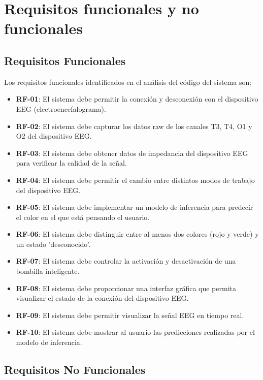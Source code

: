 \newpage

\section{Requisitos funcionales y no funcionales}
\subsection{Requisitos Funcionales}

Los requisitos funcionales identificados en el análisis del código del sistema son:

\begin{itemize}
    \item \textbf{RF-01}: El sistema debe permitir la conexión y desconexión con el dispositivo EEG (electroencefalograma).
    \item \textbf{RF-02}: El sistema debe capturar los datos raw de los canales T3, T4, O1 y O2 del dispositivo EEG.
    \item \textbf{RF-03}: El sistema debe obtener datos de impedancia del dispositivo EEG para verificar la calidad de la señal.
    \item \textbf{RF-04}: El sistema debe permitir el cambio entre distintos modos de trabajo del dispositivo EEG.
    \item \textbf{RF-05}: El sistema debe implementar un modelo de inferencia para predecir el color en el que está pensando el usuario.
    \item \textbf{RF-06}: El sistema debe distinguir entre al menos dos colores (rojo y verde) y un estado 'desconocido'.
    \item \textbf{RF-07}: El sistema debe controlar la activación y desactivación de una bombilla inteligente.
    \item \textbf{RF-08}: El sistema debe proporcionar una interfaz gráfica que permita visualizar el estado de la conexión del dispositivo EEG.
    \item \textbf{RF-09}: El sistema debe permitir visualizar la señal EEG en tiempo real.
    \item \textbf{RF-10}: El sistema debe mostrar al usuario las predicciones realizadas por el modelo de inferencia.
\end{itemize}

\newpage

\subsection{Requisitos No Funcionales}


